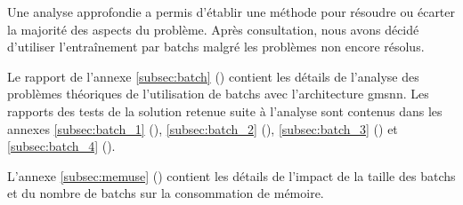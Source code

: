 Une analyse approfondie a permis d'établir une méthode pour résoudre ou écarter la majorité des aspects du problème. Après consultation, nous avons décidé d'utiliser l'entraînement par \glspl{batch} malgré les problèmes non encore résolus.

Le rapport de l'annexe \ref{subsec:batch} () contient les détails de l'analyse des problèmes théoriques de l'utilisation de \glspl{batch} avec l'architecture \gls{gmsnn}. Les rapports des tests de la solution retenue suite à l'analyse sont contenus dans les annexes \ref{subsec:batch_1} (), \ref{subsec:batch_2} (), \ref{subsec:batch_3} () et \ref{subsec:batch_4} ().

L'annexe \ref{subsec:memuse} () contient les détails de l'impact de la taille des \glspl{batch} et du nombre de \glspl{batch} sur la consommation de mémoire.